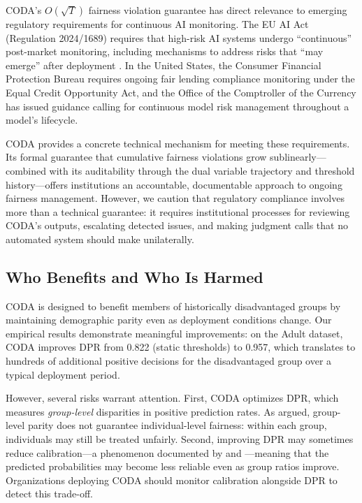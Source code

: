 \documentclass[letterpaper]{article} %
\theoremstyle{definition}
\begin{document}
CODA's $O(\sqrt{T})$ fairness violation guarantee has direct relevance to emerging regulatory requirements for continuous AI monitoring. The EU AI Act (Regulation 2024/1689) requires that high-risk AI systems undergo ``continuous'' post-market monitoring, including mechanisms to address risks that ``may emerge'' after deployment \cite{euaiact2024}. In the United States, the Consumer Financial Protection Bureau requires ongoing fair lending compliance monitoring under the Equal Credit Opportunity Act, and the Office of the Comptroller of the Currency has issued guidance calling for continuous model risk management throughout a model's lifecycle.

CODA provides a concrete technical mechanism for meeting these requirements. Its formal guarantee that cumulative fairness violations grow sublinearly---combined with its auditability through the dual variable trajectory and threshold history---offers institutions an accountable, documentable approach to ongoing fairness management. However, we caution that regulatory compliance involves more than a technical guarantee: it requires institutional processes for reviewing CODA's outputs, escalating detected issues, and making judgment calls that no automated system should make unilaterally.

\subsection{Who Benefits and Who Is Harmed}

CODA is designed to benefit members of historically disadvantaged groups by maintaining demographic parity even as deployment conditions change. Our empirical results demonstrate meaningful improvements: on the Adult dataset, CODA improves DPR from 0.822 (static thresholds) to 0.957, which translates to hundreds of additional positive decisions for the disadvantaged group over a typical deployment period.

However, several risks warrant attention. First, CODA optimizes DPR, which measures \emph{group-level} disparities in positive prediction rates. As \citet{dwork2012fairness} argued, group-level parity does not guarantee individual-level fairness: within each group, individuals may still be treated unfairly. Second, improving DPR may sometimes reduce calibration---a phenomenon documented by \citet{chouldechova2017fair} and \citet{pleiss2017fairness}---meaning that the predicted probabilities may become less reliable even as group ratios improve. Organizations deploying CODA should monitor calibration alongside DPR to detect this trade-off.
\end{document}
